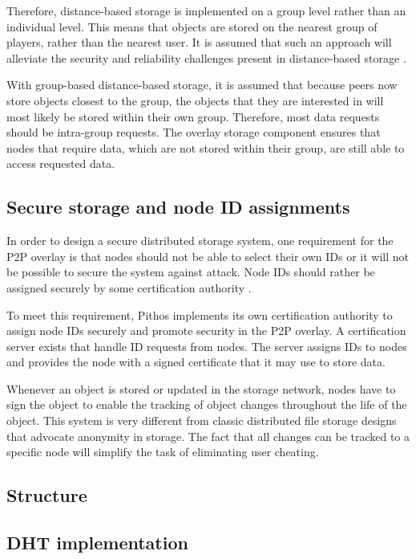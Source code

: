 Therefore, distance-based storage is implemented on a group level rather than an individual level. This means that objects are stored on the nearest
group of players, rather than the nearest user. It is assumed that such an approach will alleviate the security and reliability challenges present in
distance-based storage \cite{gilmore_p2p_mmog_state_persistency}.

With group-based distance-based storage, it is assumed that because peers now store objects closest to the group, the objects that they are
interested in will most likely be stored within their own group. Therefore, most data requests should be intra-group requests. The overlay storage
component ensures that nodes that require data, which are not stored within their group, are still able to access requested data.

\subsection{Secure storage and node ID assignments}
\label{secure_ids}

In order to design a secure distributed storage system, one requirement for the P2P overlay is that nodes should not be able to select their own IDs
or it will not be possible to secure the system against attack. Node IDs should rather be assigned securely by some certification authority
\cite{secure_overlay_routing}.

To meet this requirement, Pithos implements its own certification authority to assign node IDs securely and promote security in the P2P overlay. A
certification server exists that handle ID requests from nodes. The server assigns IDs to nodes and provides the node with a signed certificate that
it may use to store data.

Whenever an object is stored or updated in the storage network, nodes have to sign the object to enable the tracking of object changes throughout the
life of the object. This system is very different from classic distributed file storage designs that advocate anonymity in storage. The fact that all
changes can be tracked to a specific node will simplify the task of eliminating user cheating.

    \subsection{Structure}

        \subsection{DHT implementation}

